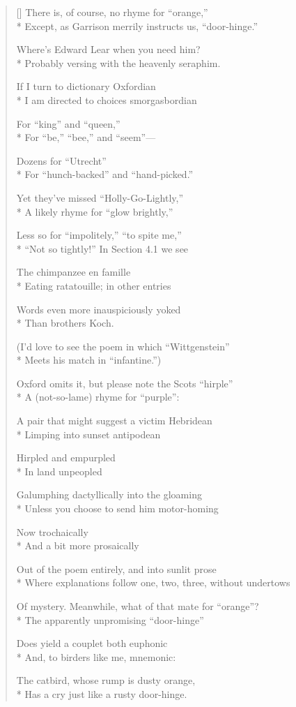 \label{ch:on_first_looking}
\settowidth{\versewidth}{Of mystery.          Meanwhile, what of that mate for ``orange''?}
\begin{verse}[\versewidth]
There is, of course, no rhyme for ``orange,''\\*
Except, as Garrison merrily instructs us, ``door-hinge.''

Where's Edward Lear when you need him?\\*
Probably versing with the heavenly seraphim.

If I turn to dictionary Oxfordian\\*
I am directed to choices smorgasbordian

For ``king'' and ``queen,''\\*
For ``be,'' ``bee,'' and ``seem''---

Dozens for ``Utrecht''\\*
For ``hunch-backed'' and ``hand-picked.''

Yet they've missed ``Holly-Go-Lightly,''\\*
A likely rhyme for ``glow brightly,''

Less so for ``impolitely,'' ``to spite me,''\\*
``Not so tightly!''    In Section 4.1 we see

The chimpanzee en famille\\*
Eating ratatouille; in other entries

Words even more inauspiciously yoked\\*
Than brothers Koch.

(I'd love to see the poem in which ``Wittgenstein''\\*
Meets his match in ``infantine.'')

Oxford omits it, but please note the Scots ``hirple''\\*
A (not-so-lame) rhyme for ``purple'':

A pair that might suggest a victim Hebridean\\*
Limping into sunset antipodean

Hirpled and empurpled\\*
In land unpeopled

Galumphing dactyllically into the gloaming\\*
Unless you choose to send him motor-homing

Now trochaically\\*
And a bit more prosaically

Out of the poem entirely, and into sunlit prose\\*
Where explanations follow one, two, three, without undertows

Of mystery.          Meanwhile, what of that mate for ``orange''?\\*
The apparently unpromising ``door-hinge''

Does yield a couplet both euphonic\\*
And, to birders like me, mnemonic:

The catbird, whose rump is dusty orange,\\*
Has a cry just like a rusty door-hinge.
\end{verse}

